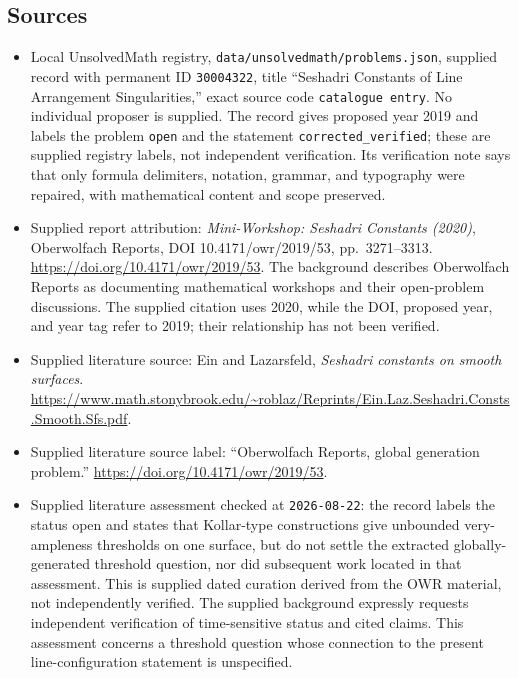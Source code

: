 \documentclass[11pt]{article}
\begin{document}
\subsection{Sources}
\begin{itemize}
\item Local UnsolvedMath registry, \texttt{data/unsolvedmath/problems.json}, supplied record with permanent ID \texttt{30004322}, title ``Seshadri Constants of Line Arrangement Singularities,'' exact source code \texttt{catalogue entry}. No individual proposer is supplied. The record gives proposed year 2019 and labels the problem \texttt{open} and the statement \texttt{corrected\_verified}; these are supplied registry labels, not independent verification. Its verification note says that only formula delimiters, notation, grammar, and typography were repaired, with mathematical content and scope preserved.
\item Supplied report attribution: \emph{Mini-Workshop: Seshadri Constants (2020)}, Oberwolfach Reports, DOI 10.4171/owr/2019/53, pp.~3271--3313. \url{https://doi.org/10.4171/owr/2019/53}. The background describes Oberwolfach Reports as documenting mathematical workshops and their open-problem discussions. The supplied citation uses 2020, while the DOI, proposed year, and year tag refer to 2019; their relationship has not been verified.
\item Supplied literature source: Ein and Lazarsfeld, \emph{Seshadri constants on smooth surfaces}. \url{https://www.math.stonybrook.edu/~roblaz/Reprints/Ein.Laz.Seshadri.Consts.Smooth.Sfs.pdf}.
\item Supplied literature source label: ``Oberwolfach Reports, global generation problem.'' \url{https://doi.org/10.4171/owr/2019/53}.
\item Supplied literature assessment checked at \texttt{2026-08-22}: the record labels the status open and states that Kollar-type constructions give unbounded very-ampleness thresholds on one surface, but do not settle the extracted globally-generated threshold question, nor did subsequent work located in that assessment. This is supplied dated curation derived from the OWR material, not independently verified. The supplied background expressly requests independent verification of time-sensitive status and cited claims. This assessment concerns a threshold question whose connection to the present line-configuration statement is unspecified.
\end{itemize}
\end{document}
